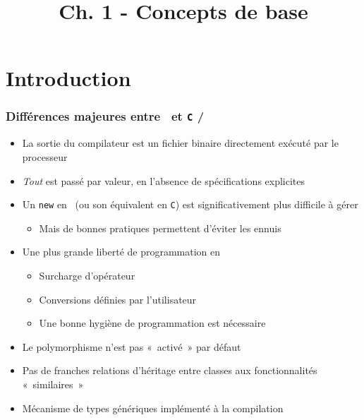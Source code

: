 


\title{Ch. 1 - Concepts de base}




\section{Introduction}

\begin{frame}
\frametitle{Différences majeures entre \java\ et \texttt{C} / \cpp}
\begin{itemize}[<+->]
\item La sortie du compilateur est un fichier binaire directement exécuté par le processeur
\item \emph{Tout} est passé par valeur, en l'absence de spécifications explicites
\item Un \lstinline|new| en \cpp\ (ou son équivalent en \texttt{C}) est significativement plus difficile à gérer
	\begin{itemize}
	\item Mais de bonnes pratiques permettent d'éviter les ennuis
	\end{itemize}
\item Une plus grande liberté de programmation en \cpp
	\begin{itemize}
	\item Surcharge d'opérateur
	\item Conversions définies par l'utilisateur
	\item Une bonne hygiène de programmation est nécessaire
	\end{itemize}
\item Le polymorphisme n'est pas «~activé~» par défaut
\item Pas de franches relations d'héritage entre classes aux fonctionnalités «~similaires~»
\item Mécanisme de types génériques implémenté à la compilation
\end{itemize}
\end{frame}


